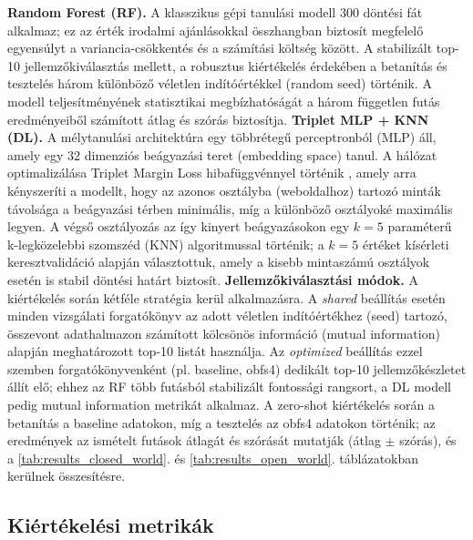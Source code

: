 \documentclass[a4paper,oneside]{article}
\begin{document}
\textbf{Random Forest (RF).} A klasszikus gépi tanulási modell 300 döntési fát alkalmaz; ez az érték irodalmi ajánlásokkal \cite{breiman2001} összhangban biztosít megfelelő egyensúlyt a variancia-csökkentés és a számítási költség között.
A stabilizált top-10 jellemzőkiválasztás mellett, a robusztus kiértékelés érdekében a betanítás és tesztelés három különböző véletlen indítóértékkel (random seed) történik.
A modell teljesítményének statisztikai megbízhatóságát a három független futás eredményeiből számított átlag és szórás biztosítja. \newline
\textbf{Triplet MLP + KNN (DL).} A mélytanulási architektúra egy többrétegű perceptronból (MLP) áll, amely egy 32 dimenziós beágyazási teret (embedding space) tanul.
A hálózat optimalizálása Triplet Margin Loss hibafüggvénnyel történik \cite{hoffer2015}, amely arra kényszeríti a modellt, hogy az azonos osztályba (weboldalhoz) tartozó minták távolsága a beágyazási térben minimális, míg a különböző osztályoké maximális legyen.
A végső osztályozás az így kinyert beágyazásokon egy $k=5$ paraméterű k-legközelebbi szomszéd (KNN) algoritmussal történik; a $k=5$ értéket kísérleti keresztvalidáció alapján választottuk, amely a kisebb mintaszámú osztályok esetén is stabil döntési határt biztosít. \newline
\textbf{Jellemzőkiválasztási módok.} A kiértékelés során kétféle stratégia kerül alkalmazásra. A \textit{shared} beállítás esetén minden vizsgálati forgatókönyv az adott véletlen indítóértékhez (seed) tartozó, összevont adathalmazon számított kölcsönös információ (mutual information) alapján meghatározott top-10 listát használja.
Az \textit{optimized} beállítás ezzel szemben forgatókönyvenként (pl. baseline, obfs4) dedikált top-10 jellemzőkészletet állít elő;
ehhez az RF több futásból stabilizált fontossági rangsort, a DL modell pedig mutual information metrikát alkalmaz.
A zero-shot kiértékelés során a betanítás a baseline adatokon, míg a tesztelés az obfs4 adatokon történik; az eredmények az ismételt futások átlagát és szórását mutatják (átlag $\pm$ szórás), és a \ref{tab:results_closed_world}. és \ref{tab:results_open_world}. táblázatokban kerülnek összesítésre.
\subsection{Kiértékelési metrikák}
\end{document}
